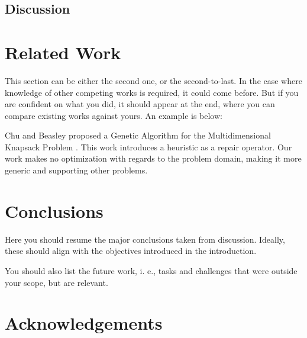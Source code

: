 \documentclass[conference]{IEEEtran}
\begin{document}
\subsection{Discussion}

\section{Related Work}

This section can be either the second one, or the second-to-last. In the case where knowledge of other competing works is required, it could come before. But if you are confident on what you did, it should appear at the end, where you can compare existing works against yours. An example is below:

Chu and Beasley proposed a Genetic Algorithm for the Multidimensional Knapsack Problem \cite{DBLP:journals/heuristics/ChuB98}. This work introduces a heuristic as a repair operator. Our work makes no optimization with regards to the problem domain, making it more generic and supporting other problems.

\section{Conclusions}

Here you should resume the major conclusions taken from discussion. Ideally, these should align with the objectives introduced in the introduction.


You should also list the future work, i. e., tasks and challenges that were outside your scope, but are relevant.

\section*{Acknowledgements}
\end{document}
